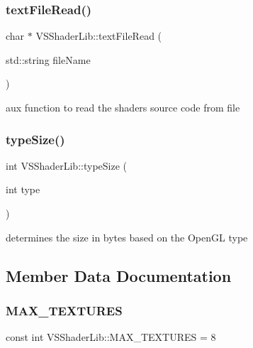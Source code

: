 \subsubsection{\texorpdfstring{text\+File\+Read()}{textFileRead()}}
{\footnotesize\ttfamily char $\ast$ V\+S\+Shader\+Lib\+::text\+File\+Read (\begin{DoxyParamCaption}\item[{std\+::string}]{file\+Name }\end{DoxyParamCaption})\hspace{0.3cm}{\ttfamily [protected]}}



aux function to read the shader\textquotesingle{}s source code from file 

\mbox{\label{class_v_s_shader_lib_a23d7f374028eeb02cd6df8019eaa7a6f}} 
\subsubsection{\texorpdfstring{type\+Size()}{typeSize()}}
{\footnotesize\ttfamily int V\+S\+Shader\+Lib\+::type\+Size (\begin{DoxyParamCaption}\item[{int}]{type }\end{DoxyParamCaption})\hspace{0.3cm}{\ttfamily [protected]}}



determines the size in bytes based on the Open\+GL type 



\subsection{Member Data Documentation}
\mbox{\label{class_v_s_shader_lib_a36238c6b408901ce134d224f27138813}} 
\subsubsection{\texorpdfstring{M\+A\+X\+\_\+\+T\+E\+X\+T\+U\+R\+ES}{MAX\_TEXTURES}}
{\footnotesize\ttfamily const int V\+S\+Shader\+Lib\+::\+M\+A\+X\+\_\+\+T\+E\+X\+T\+U\+R\+ES = 8\hspace{0.3cm}{\ttfamily [static]}}



